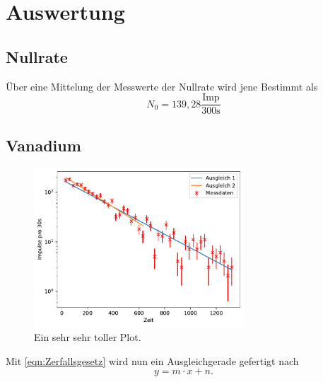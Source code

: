 \newpage
\section{Auswertung}
\subsection{Nullrate}
Über eine Mittelung der Messwerte der Nullrate wird jene Bestimmt als
\begin{equation}
    N_0 = 139,28 \frac{\text{Imp}}{300\text{s}}
\end{equation}
\subsection{Vanadium}
\begin{figure}
    \centering
    \includegraphics[width=0.7\textwidth]{plots/Vanadium.pdf}
    \caption{Ein sehr sehr toller Plot.}
\end{figure}
Mit \ref{eqn:Zerfallsgesetz} wird nun ein Ausgleichgerade gefertigt nach
\begin{equation*}
    y=m\cdot x+n.
\end{equation*}
